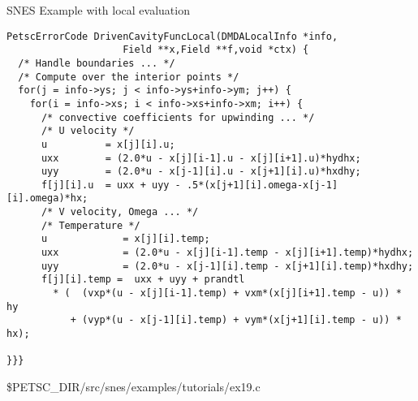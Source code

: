 \begin{frame}[fragile]{SNES Example with local evaluation}
\begin{verbatim}
PetscErrorCode DrivenCavityFuncLocal(DMDALocalInfo *info,
                    Field **x,Field **f,void *ctx) {
  /* Handle boundaries ... */
  /* Compute over the interior points */
  for(j = info->ys; j < info->ys+info->ym; j++) {
    for(i = info->xs; i < info->xs+info->xm; i++) {
      /* convective coefficients for upwinding ... */
      /* U velocity */
      u          = x[j][i].u;
      uxx        = (2.0*u - x[j][i-1].u - x[j][i+1].u)*hydhx;
      uyy        = (2.0*u - x[j-1][i].u - x[j+1][i].u)*hxdhy;
      f[j][i].u  = uxx + uyy - .5*(x[j+1][i].omega-x[j-1][i].omega)*hx;
      /* V velocity, Omega ... */
      /* Temperature */
      u             = x[j][i].temp;
      uxx           = (2.0*u - x[j][i-1].temp - x[j][i+1].temp)*hydhx;
      uyy           = (2.0*u - x[j-1][i].temp - x[j+1][i].temp)*hxdhy;
      f[j][i].temp =  uxx + uyy + prandtl
        * (  (vxp*(u - x[j][i-1].temp) + vxm*(x[j][i+1].temp - u)) * hy
           + (vyp*(u - x[j-1][i].temp) + vym*(x[j+1][i].temp - u)) * hx);

}}}
\end{verbatim}

\begin{center}\small
\$PETSC\_DIR/src/snes/examples/tutorials/ex19.c
\end{center}
\end{frame}

